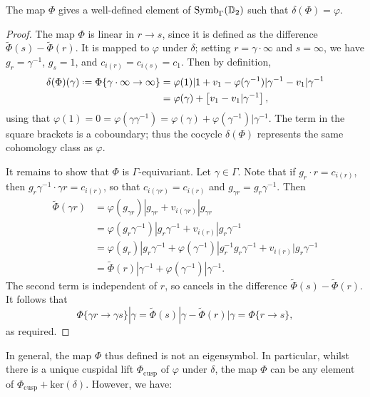 \documentclass[a4paper,10pt]{article}
\numberwithin{equation}{section}
\begin{document}
	
	\begin{proposition}
		The map $\Phi$ gives a well-defined element of $\mathrm{Symb}_{\Gamma}(\mathbb{D}_2)$ such that $\delta(\Phi) = \varphi$.
	\end{proposition}
	\begin{proof}
		The map $\Phi$ is linear in $r \to s$, since it is defined as the difference $\widetilde{\Phi}(s) - \widetilde{\Phi}(r)$. It is mapped to $\varphi$ under $\delta$; setting $r = \gamma\cdot\infty$ and $s = \infty$, we have $g_r = \gamma^{-1}$, $g_s = 1$, and $c_{i(r)} = c_{i(s)} = c_1$. Then by definition,
		\begin{align*}
			\delta(\Phi)(\gamma) \defeq \Phi\{\gamma\cdot\infty \to \infty\} &= \varphi(1)|1 + v_1 - \varphi(\gamma^{-1})|\gamma^{-1} - v_1|\gamma^{-1}\\
									&= \varphi(\gamma) + \left[v_1 - v_1|\gamma^{-1}\right],
		\end{align*}
		using that $\varphi(1) = 0 = \varphi(\gamma\gamma^{-1}) = \varphi(\gamma) + \varphi(\gamma^{-1})|\gamma^{-1}$. The term in the square brackets is a coboundary; thus the cocycle $\delta(\Phi)$ represents the same cohomology class as $\varphi$.
		
		It remains to show that $\Phi$ is $\Gamma$-equivariant. Let $\gamma \in \Gamma$. Note that if $g_r \cdot r = c_{i(r)}$, then $g_r\gamma^{-1} \cdot \gamma r = c_{i(r)}$, so that $c_{i(\gamma r)} = c_{i(r)}$ and $g_{\gamma r} = g_r\gamma^{-1}$. Then
		\begin{align*}
			\widetilde{\Phi}(\gamma r) &= \varphi(g_{\gamma r})|g_{\gamma r} + v_{i(\gamma r)}|g_{\gamma r}\\
					 &= \varphi(g_r \gamma^{-1})|g_r\gamma^{-1} + v_{i(r)}|g_r\gamma^{-1}\\
						&= \varphi(g_r)|g_r\gamma^{-1} + \varphi(\gamma^{-1})|g_r^{-1}g_r\gamma^{-1} + v_{i(r)}|g_r\gamma^{-1}\\
						&= \widetilde{\Phi}(r)|\gamma^{-1} + \varphi(\gamma^{-1})|\gamma^{-1}.
		\end{align*}
		The second term is independent of $r$, so cancels in the difference $\widetilde{\Phi}(s) - \widetilde{\Phi}(r)$. It follows that
		\[
			\Phi\{\gamma r \to \gamma s\}|\gamma = \widetilde{\Phi}(s)|\gamma - \widetilde{\Phi}(r)|\gamma = \Phi\{r\to s\},
		\]
		as required.
	\end{proof}

In general, the map $\Phi$ thus defined is not an eigensymbol. In particular, whilst there is a unique cuspidal lift $\Phi_{\mathrm{cusp}}$ of $\varphi$ under $\delta$, the map $\Phi$ can be any element of $\Phi_{\mathrm{cusp}} + \mathrm{ker}(\delta)$. However, we have:
\end{document}
